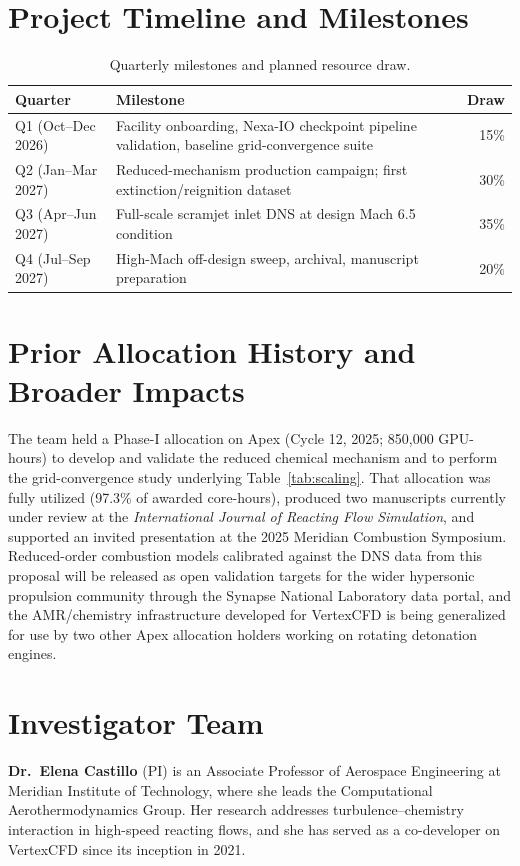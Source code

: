 \documentclass[11pt,a4paper]{scrartcl}
\begin{document}
\section{Project Timeline and Milestones}
\begin{table}[h!]
\centering
\caption{Quarterly milestones and planned resource draw.}
\label{tab:timeline}
\begin{tabularx}{\linewidth}{@{}lXr@{}}
\toprule
\textbf{Quarter} & \textbf{Milestone} & \textbf{Draw} \\
\midrule
Q1 (Oct--Dec 2026) & Facility onboarding, Nexa-IO checkpoint pipeline validation, baseline grid-convergence suite & 15\% \\
Q2 (Jan--Mar 2027) & Reduced-mechanism production campaign; first extinction/reignition dataset & 30\% \\
Q3 (Apr--Jun 2027) & Full-scale scramjet inlet DNS at design Mach 6.5 condition & 35\% \\
Q4 (Jul--Sep 2027) & High-Mach off-design sweep, archival, manuscript preparation & 20\% \\
\bottomrule
\end{tabularx}
\end{table}

\section{Prior Allocation History and Broader Impacts}
\label{sec:prior}
The team held a Phase-I allocation on Apex (Cycle 12, 2025; 850,000 GPU-hours) to develop and validate the reduced chemical mechanism and to perform the grid-convergence study underlying Table~\ref{tab:scaling}. That allocation was fully utilized (97.3\% of awarded core-hours), produced two manuscripts currently under review at the \emph{International Journal of Reacting Flow Simulation}, and supported an invited presentation at the 2025 Meridian Combustion Symposium. Reduced-order combustion models calibrated against the DNS data from this proposal will be released as open validation targets for the wider hypersonic propulsion community through the Synapse National Laboratory data portal, and the AMR/chemistry infrastructure developed for VertexCFD is being generalized for use by two other Apex allocation holders working on rotating detonation engines.

\section{Investigator Team}
\textbf{Dr.\ Elena Castillo} (PI) is an Associate Professor of Aerospace Engineering at Meridian Institute of Technology, where she leads the Computational Aerothermodynamics Group. Her research addresses turbulence--chemistry interaction in high-speed reacting flows, and she has served as a co-developer on VertexCFD since its inception in 2021.
\end{document}
